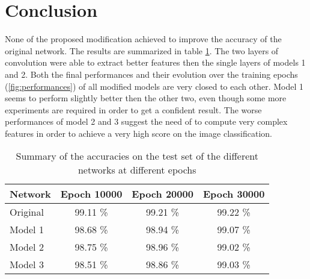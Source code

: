 \section{Conclusion}
\label{sec:conclusion}

None of the proposed modification achieved to improve the accuracy of the original network.
The results are summarized in table \cref{tab:summary}.
The two layers of convolution were able to extract better features then the single layers of models 1 and 2.
Both the final performances and their evolution over the training epochs (\cref{fig:performances}) of all modified models are very closed to each other.
Model 1 seems to perform slightly better then the other two, even though some more experiments are required in order to get a confident result.
The worse performances of model 2 and 3 suggest the need of to compute very complex features in order to achieve a very high score on the image classification.


\begin{table}
	\centering
	\caption{Summary of the accuracies on the test set of the different networks at different epochs}
	\label{tab:summary}
	\begin{tabular}{lccc}
		\toprule
			\multicolumn{1}{l}{Network} &
			\multicolumn{1}{c}{Epoch 10000} &
			\multicolumn{1}{c}{Epoch 20000} &
			\multicolumn{1}{c}{Epoch 30000} \\
		\midrule
			Original & 99.11 \% & 99.21 \% & 99.22 \% \\
			Model 1  & 98.68 \% & 98.94 \% & 99.07 \% \\
			Model 2  & 98.75 \% & 98.96 \% & 99.02 \% \\
			Model 3  & 98.51 \% & 98.86 \% & 99.03 \% \\
		\bottomrule
	\end{tabular}
\end{table}
